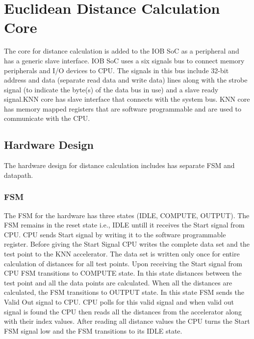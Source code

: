 \documentclass[12pt]{article}
\begin{document}
\section{Euclidean Distance Calculation Core}
The core for distance calculation is added to the IOB SoC as a peripheral and has a generic slave interface. IOB SoC uses a six signals bus to connect memory peripherals and I/O devices to CPU. The signals in this bus include 32-bit address and data (separate read data and write data) lines along with the strobe signal (to indicate the byte(s) of the data bus in use) and a slave ready signal.KNN core has slave interface that connects with the system bus. KNN core has memory mapped registers that are software programmable and are used to communicate with the CPU.
\subsection{Hardware Design}
The hardware design for distance calculation includes has separate FSM and datapath.
\subsubsection{FSM}
The FSM for the hardware has three states (IDLE, COMPUTE, OUTPUT). The FSM remains in the reset state i.e., IDLE untill it receives the Start signal from CPU. CPU sends Start signal by writing it to the software programmable register. Before giving the Start Signal CPU writes the complete data set and the test point to the KNN accelerator. The data set is written only once for entire calculation of distances for all test points.
Upon receiving the Start signal from CPU FSM transitions to COMPUTE state. In this state distances between the test point and all the data points are calculated. When all the distances are calculated, the FSM transitions to OUTPUT state. In this state FSM sends the Valid Out signal to CPU. CPU polls for this valid signal and when valid out signal is found the CPU then reads all the distances from the accelerator along with their index values. After reading all distance values the CPU turns the Start FSM signal low and the FSM transitions to its IDLE state.
\end{document}

